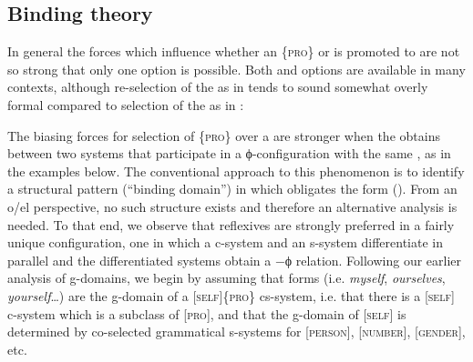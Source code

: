 \subsection{Binding theory}

In general the forces which influence whether an  \{\textsc{pro}\} or  is promoted to  are not so strong that only one option is possible. Both  and  options are available in many contexts, although re-selection of the  as in  tends to sound somewhat overly formal compared to selection of the  as in :

\ea\label{ex:7:13}
   \label{ex:7:13a}
    \label{ex:7:13b}
\z
\z

  The biasing forces for selection of \{\textsc{pro}\} over a  are stronger when the  obtains between two systems that participate in a ϕ-con\-fig\-u\-ra\-tion with the same , as in the examples below. The conventional approach to this phenomenon is to identify a structural pattern (“binding domain”) in which  obligates the  form (\citealt{Chomsky1982,Chomsky1993,Haegeman1994,Reinhart1976,Safir2004}). From an o/el perspective, no such structure exists and therefore an alternative analysis is needed. To that end, we observe that reflexives are strongly preferred in a fairly unique configuration, one in which a c-system and an s-system differentiate in parallel and the differentiated systems obtain a −ϕ relation. Following our earlier analysis of  g-domains, we begin by assuming that  forms (i.e. \textit{myself}, \textit{ourselves}, \textit{yourself}…) are the g-domain of a [\textsc{self}]\{\textsc{pro}\} cs-system, i.e. that there is a [\textsc{self}] c-system which is a subclass of [\textsc{pro}], and that the g-domain of [\textsc{self}] is determined by co-selected grammatical s-systems for [\textsc{person}], [\textsc{number}], [\textsc{gender}], etc. 

\ea\label{ex:7:14}
 \label{ex:7:14a}     
 \label{ex:7:14b}       
\z
\z

